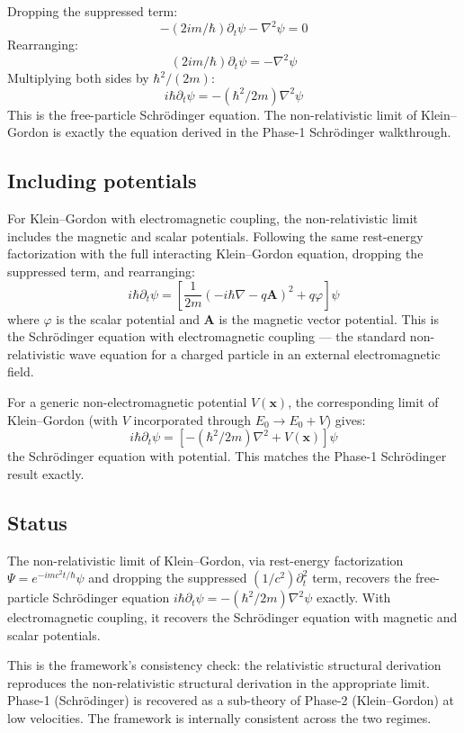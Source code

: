 \documentclass[11pt,a4paper]{article}
\begin{document}
Dropping the suppressed term:
\[
-(2im/\hbar)\partial_t\psi - \nabla^{2}\psi = 0
\]
Rearranging:
\[
(2im/\hbar)\partial_t\psi = -\nabla^{2}\psi
\]
Multiplying both sides by $\hbar^2/(2m)$:
\[
i\hbar\partial_t\psi = -(\hbar^{2}/2m)\nabla^{2}\psi
\]
This is the free-particle Schr\"odinger equation. The non-relativistic limit of Klein--Gordon is exactly the equation derived in the Phase-1 Schr\"odinger walkthrough.

\subsection{Including potentials}

For Klein--Gordon with electromagnetic coupling, the non-relativistic limit includes the magnetic and scalar potentials. Following the same rest-energy factorization with the full interacting Klein--Gordon equation, dropping the suppressed term, and rearranging:
\[
i\hbar\partial_t\psi = \left[\frac{1}{2m}(-i\hbar\nabla - q\mathbf{A})^{2} + q\varphi\right]\psi
\]
where $\varphi$ is the scalar potential and $\mathbf{A}$ is the magnetic vector potential. This is the Schr\"odinger equation with electromagnetic coupling --- the standard non-relativistic wave equation for a charged particle in an external electromagnetic field.

For a generic non-electromagnetic potential $V(\mathbf{x})$, the corresponding limit of Klein--Gordon (with $V$ incorporated through $E_0 \to E_0 + V$) gives:
\[
i\hbar\partial_t\psi = [-(\hbar^{2}/2m)\nabla^{2} + V(\mathbf{x})]\psi
\]
the Schr\"odinger equation with potential. This matches the Phase-1 Schr\"odinger result exactly.

\subsection{Status}

The non-relativistic limit of Klein--Gordon, via rest-energy factorization $\Psi = e^{-imc^2t/\hbar}\psi$ and dropping the suppressed $(1/c^2)\partial_t^2$ term, recovers the free-particle Schr\"odinger equation $i\hbar\partial_t\psi = -(\hbar^2/2m)\nabla^2\psi$ exactly. With electromagnetic coupling, it recovers the Schr\"odinger equation with magnetic and scalar potentials.

This is the framework's consistency check: the relativistic structural derivation reproduces the non-relativistic structural derivation in the appropriate limit. Phase-1 (Schr\"odinger) is recovered as a sub-theory of Phase-2 (Klein--Gordon) at low velocities. The framework is internally consistent across the two regimes.
\end{document}
